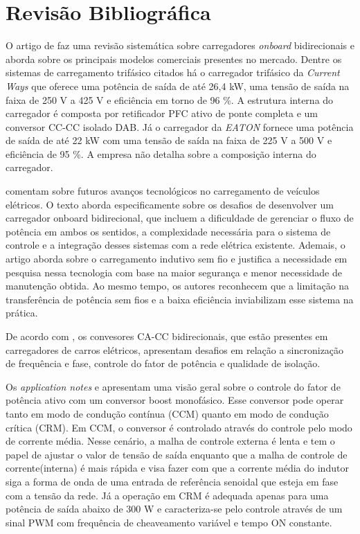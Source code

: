 \chapter{Revisão Bibliográfica}

O artigo de \cite{Yuan:2021} faz uma revisão sistemática sobre carregadores \textit{onboard}
bidirecionais e aborda sobre os principais modelos comerciais presentes no mercado. Dentre os
sistemas de carregamento trifásico citados há o carregador trifásico da \textit{Current Ways}
que oferece uma potência de saída de até 26,4 kW, uma tensão de saída na faixa de 250 V a 425 V
e eficiência em torno de 96 \%. A estrutura interna do carregador é composta por retificador
PFC ativo de ponte completa e um conversor CC-CC isolado DAB. Já o carregador da \textit{EATON}
fornece uma potência de saída de até 22 kW com uma tensão de saída na faixa de 225 V a 500 V e
eficiência de 95 \%. A empresa não detalha sobre a composição interna do carregador.

\cite{Baharom:2024} comentam sobre futuros avanços tecnológicos no carregamento de veículos elétricos. O texto aborda especificamente sobre os desafios de desenvolver um carregador onboard bidirecional, que incluem a dificuldade de gerenciar o fluxo de potência em ambos os sentidos, a complexidade necessária para o sistema de controle e a integração desses sistemas com a rede elétrica existente. Ademais, o artigo aborda sobre o carregamento indutivo sem fio e justifica a necessidade em pesquisa nessa tecnologia com base na maior segurança e menor necessidade de manutenção obtida. Ao mesmo tempo, os autores reconhecem que a limitação na transferência de potência sem fios e a baixa eficiência inviabilizam esse sistema na prática.

De acordo com \cite{Kumar:2021}, os convesores CA-CC bidirecionais, que estão presentes em
carregadores de carros elétricos, apresentam desafios em relação a sincronização de frequência
e fase, controle do fator de potência e qualidade de isolação.


Os \textit{application notes} \cite{onsemi_hbd853} e \cite{ti_zhcp224} apresentam uma visão
geral sobre o controle do fator de potência ativo com um conversor boost monofásico. Esse
conversor pode operar tanto em modo de condução contínua (CCM) quanto em modo de condução
crítica (CRM). Em CCM, o conversor é controlado através do controle pelo modo de corrente
média. Nesse cenário, a malha de controle externa é lenta e tem o papel de ajustar o valor de
tensão de saída enquanto que a malha de controle de corrente(interna) é mais rápida e visa
fazer com que a corrente média do indutor siga a forma de onda de uma entrada de referência
senoidal que esteja em fase com a tensão da rede. Já a operação em CRM é adequada apenas para
uma potência de saída abaixo de 300 W e caracteriza-se pelo controle através de um sinal PWM
com frequência de cheaveamento variável e tempo ON constante.

